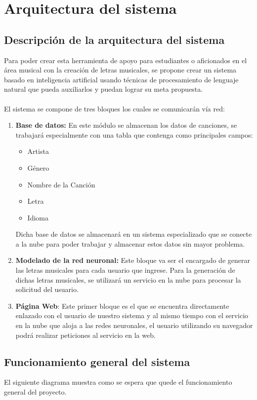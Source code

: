 \documentclass[12pt, a4paper, titlepage]{report}
\begin{document}
\section{Arquitectura del sistema}
		\subsection{Descripción de la arquitectura del sistema}
		Para poder crear esta herramienta de apoyo para estudiantes o aficionados en el área musical con la creación de letras musicales, se propone crear un sistema basado en inteligencia artificial usando técnicas de procesamiento de lenguaje natural que pueda auxiliarlos y puedan lograr su meta propuesta.\\\\	
		El sistema se compone de tres bloques los cuales se comunicarán vía red:
		\begin{enumerate}
			\item \textbf{Base de datos:} En este módulo se almacenan los datos de canciones, se trabajará especialmente con una tabla que contenga como principales campos:
			\begin{itemize}
				\item Artista
				\item Género
				\item Nombre de la Canción
				\item Letra
				\item Idioma
			\end{itemize}
			Dicha base de datos se almacenará en un sistema especializado que se conecte a la nube para poder trabajar y almacenar estos datos sin mayor problema.
			\item \textbf{Modelado de la red neuronal:} Este bloque va ser el encargado de generar las letras musicales para cada usuario que ingrese. Para la generación de dichas letras musicales, se utilizará un servicio en la nube para procesar la solicitud del usuario. 
			\item \textbf{Página Web}: Este primer bloque es el que se encuentra directamente enlazado con el usuario de nuestro sistema y al mismo tiempo con el servicio en la nube que aloja a las redes neuronales, el usuario utilizando su navegador podrá realizar peticiones al servicio en la web.
		\end{enumerate}
	
		\subsection{Funcionamiento general del sistema}
		El siguiente diagrama muestra como se espera que quede el funcionamiento general del proyecto.
	
\end{document}
